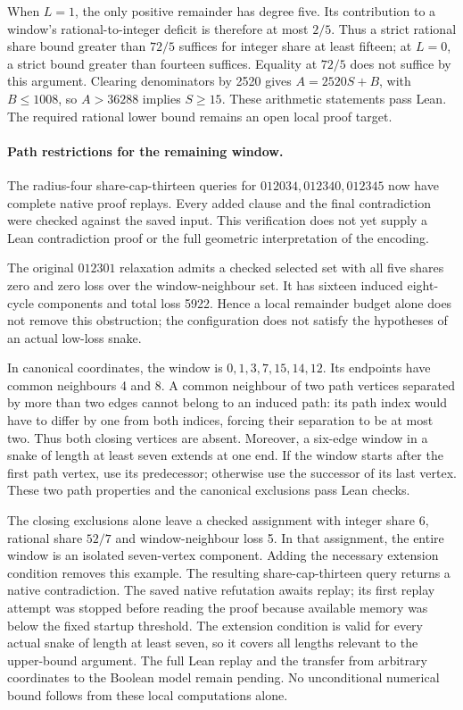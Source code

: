 \documentclass[11pt,a4paper]{article}
\begin{document}
When $L=1$, the only positive remainder has degree five. Its contribution
to a window's rational-to-integer deficit is therefore at most $2/5$.
Thus a strict rational share bound greater than $72/5$ suffices for
integer share at least fifteen; at $L=0$, a strict bound greater than
fourteen suffices. Equality at $72/5$ does not suffice by this argument.
Clearing denominators by 2520 gives $A=2520S+B$, with $B\le1008$,
so $A>36288$ implies $S\ge15$. These arithmetic statements pass Lean.
The required rational lower bound remains an open local proof target.

\paragraph{Path restrictions for the remaining window.}
The radius-four share-cap-thirteen queries for $012034,012340,012345$
now have complete native proof replays. Every added clause and the final
contradiction were checked against the saved input. This verification
does not yet supply a Lean contradiction proof or the full geometric
interpretation of the encoding.

The original $012301$ relaxation admits a checked selected set with all
five shares zero and zero loss over the window-neighbour set. It has
sixteen induced eight-cycle components and total loss 5922. Hence a
local remainder budget alone does not remove this obstruction; the
configuration does not satisfy the hypotheses of an actual low-loss snake.

In canonical coordinates, the window is $0,1,3,7,15,14,12$. Its endpoints
have common neighbours 4 and 8. A common neighbour of two path vertices
separated by more than two edges cannot belong to an induced path:
its path index would have to differ by one from both indices, forcing
their separation to be at most two. Thus both closing vertices are absent.
Moreover, a six-edge window in a snake of length at least seven extends
at one end. If the window starts after the first path vertex, use its
predecessor; otherwise use the successor of its last vertex. These
two path properties and the canonical exclusions pass Lean checks.

The closing exclusions alone leave a checked assignment with integer
share 6, rational share $52/7$ and window-neighbour loss 5. In that
assignment, the entire window is an isolated seven-vertex component.
Adding the necessary extension condition removes this example. The
resulting share-cap-thirteen query returns a native contradiction.
The saved native refutation awaits replay; its first replay attempt was stopped before reading the proof because available memory was below the fixed startup threshold.
The extension condition is valid for every actual snake of length at
least seven, so it covers all lengths relevant to the upper-bound argument.
The full Lean replay and the transfer from arbitrary coordinates to the
Boolean model remain pending. No unconditional numerical bound follows
from these local computations alone.
\end{document}
